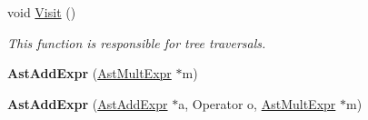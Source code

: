 \begin{DoxyCompactItemize}
\item 
void \hyperlink{classAstAddExpr_a9b80132c7e2f4378ef699cd1de46fa01}{Visit} ()
\begin{DoxyCompactList}\small\item\em This function is responsible for tree traversals. \end{DoxyCompactList}\item 
\hypertarget{classAstAddExpr_a62f5c5b3479834840ae3f18996354fe0}{{\bfseries Ast\-Add\-Expr} (\hyperlink{classAstMultExpr}{Ast\-Mult\-Expr} $\ast$m)}\label{classAstAddExpr_a62f5c5b3479834840ae3f18996354fe0}

\item 
\hypertarget{classAstAddExpr_a512bd2d176f23060ec0728d35ba1a492}{{\bfseries Ast\-Add\-Expr} (\hyperlink{classAstAddExpr}{Ast\-Add\-Expr} $\ast$a, Operator o, \hyperlink{classAstMultExpr}{Ast\-Mult\-Expr} $\ast$m)}\label{classAstAddExpr_a512bd2d176f23060ec0728d35ba1a492}


\end{DoxyCompactItemize}
